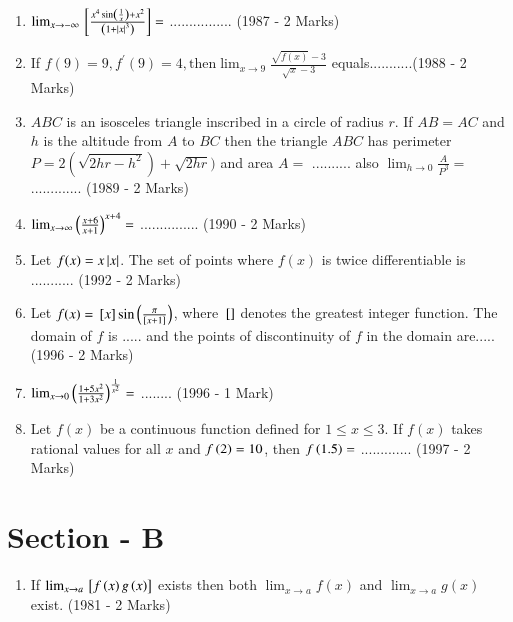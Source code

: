 \documentclass[journal]{IEEEtran}
\begin{document}
\begin{enumerate}
\item {
    $\lim_{x\to-\infty}{}\left[\frac{x^4 \sin \left(\frac{1}{x}\right) + x^2}{\left(1 + \left\vert x\right\vert^3\right)}\right] =$ ................ \hfill (1987 - 2 Marks)
}\\

\item {
    If $f(9)=9, f^{\prime}(9)=4, \text{then} \lim_{x\to9}\frac{\sqrt{f(x)}-3 }{\sqrt{x}-3}$ equals...........\hfill (1988 - 2 Marks)
}\\

\item{
    $ABC$ is an isosceles triangle inscribed in a circle of radius $r$. If $AB = AC$ and $h$ is the altitude from $A$ to $BC$ then the triangle $ABC$ has perimeter $P=2(\sqrt{2hr-h^2})+\sqrt{2hr})$ and area $A=$ .......... also $\lim_{h\to0} \frac{A}{P^3} = $............. \hfill (1989 - 2 Marks)
}\\

\item {
    $\lim_{x\to\infty}\left(\frac{x+6}{x +1}\right)^{x+4} =$ ............... \hfill (1990 - 2 Marks)
}\\

\item{
    Let $f(x) = x\left\vert x\right\vert$. The set of points where $f(x)$ is twice differentiable is ........... \hfill (1992 - 2 Marks)
}\\

\item{
    Let $f(x)= {}\left[x\right] \sin\left(\frac{\pi}{{}\left[x+1\right]}\right)$, where ${}\left[\right]$ denotes the greatest integer function. The domain of $f$ is ..... and the points of discontinuity of $f$ in the domain are..... \hfill (1996 - 2 Marks)
}\\

\item{
    $\lim_{x\to0} \left(\frac{1+5x^2}{1+3x^2}\right)^{\frac{1}{x^2}} =$ ........ \hfill (1996 - 1 Mark)
}\\

\item{
    Let $f(x)$ be a continuous function defined for $1 \leq x \leq 3$. If $f(x)$ takes rational values for all $x$ and $f\left(2\right) = 10$, then $f\left(1.5\right) = $ ............. \hfill (1997 - 2 Marks)
}\\
    
\end{enumerate}

\section*{Section - B}
\begin{enumerate}
	\item{
 If $\lim_{x\to a}{}\left[f\left(x\right)g\left(x\right)\right]$ exists then both $\lim_{x\to a}f(x)$ and $\lim_{x\to a}g(x)$ exist. \hfill (1981 - 2 Marks)
}
\end{enumerate}
\end{document}
